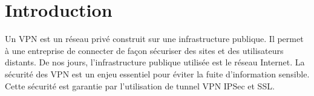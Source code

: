 \chapter*{Introduction}
Un VPN est un réseau privé construit sur une infrastructure publique. 
Il permet à une entreprise de connecter de façon sécuriser des sites et des utilisateurs distants.
De nos jours, l'infrastructure publique utilisée est le réseau Internet. 
La sécurité des VPN est un enjeu essentiel pour éviter la fuite d'information sensible. 
Cette sécurité est garantie par l'utilisation de tunnel VPN IPSec et SSL.

